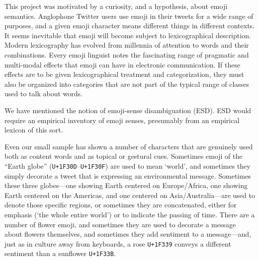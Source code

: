 \documentclass[11pt]{article}
\begin{document}
This project was motivated by a curiosity, and a hypothesis, about emoji semantics. Anglophone Twitter users use emoji in their tweets
for a wide range of purposes, and a given emoji character means different things in different contexts. It seems inevitable that emoji will
become subject to lexicographical description. Modern lexicography has evolved from millennia of attention to words and their combinations.
Every emoji linguist notes the fascinating range of pragmatic and multi-modal effects that emoji can have in electronic communication. If
these effects are to be given lexicographical treatment and categorization, they must also be organized into categories that are not part of
the typical range of classes used to talk about words.



We have mentioned the notion of emoji-sense disambiguation (ESD). ESD would require an empirical inventory of emoji senses, presumably
from an empirical lexicon of this sort. 

Even our small sample has shown a number of characters that are genuinely used both as content words
and as topical or gestural cues. Sometimes emoji of the ``Earth globe'' (\texttt{U+1F30D}--\texttt{U+1F30F}) are used to mean `world', 
and sometimes they simply decorate a tweet that is expressing an environmental message. Sometimes these three globes---one showing Earth centered
on Europe/Africa, one showing Earth centered on the Americas, and one centered on Asia/Australia---are used to denote those specific regions, 
or sometimes they are concatenated, either for emphasis (`the whole entire world') or to indicate the passing of time. There are a number of flower emoji, and sometimes they are used to decorate a message about flowers themselves, and sometimes they add sentiment to a message---and, just as in culture away from keyboards, a rose \texttt{U+1F339} conveys a different sentiment than a sunflower \texttt{U+1F33B}.




\end{document}
